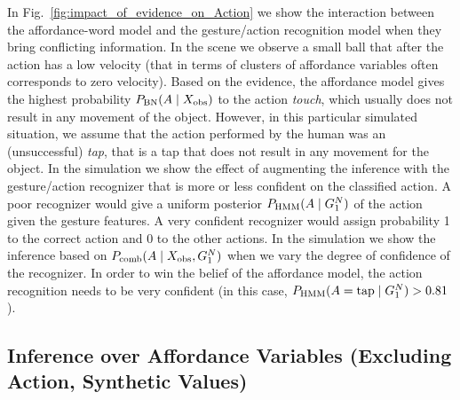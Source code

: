 In Fig.~\ref{fig:impact_of_evidence_on_Action} we show the interaction between the affordance-word model and the gesture/action recognition model when they bring conflicting information.
In the scene we observe a small ball that after the action has a low velocity (that in terms of clusters of affordance variables often corresponds to zero velocity).
Based on the evidence, the affordance model gives the highest probability $P_{\text{BN}}(A\mid X_\text{obs})$ to the action \emph{touch}, which usually does not result in any movement of the object.
However, in this particular simulated situation, we assume that the action performed by the human was an (unsuccessful) \emph{tap}, that is a tap that does not result in any movement for the object.
In the simulation we show the effect of augmenting the inference with the gesture/action recognizer that is more or less confident on the classified action.
A poor recognizer would give a uniform posterior $P_{\text{HMM}}(A\mid G_1^N)$ of the action given the gesture features.
A very confident recognizer would assign probability 1 to the correct action and 0 to the other actions.
In the simulation we show the inference based on $P_\text{comb}(A\mid X_\text{obs},G_1^N)$ when we vary the degree of confidence of the recognizer.
In order to win the belief of the affordance model, the action recognition needs to be very confident (in this case, $P_{\text{HMM}}(A=\text{tap}\mid G_1^N) > 0.81 $).

\subsection{Inference over Affordance Variables (Excluding Action, Synthetic Values)}

